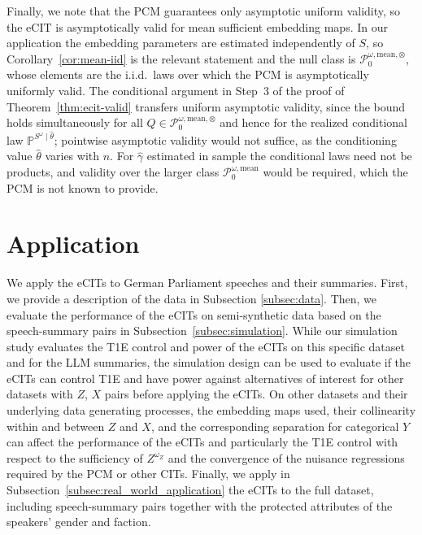 \documentclass[twoside,11pt]{article}
\begin{document}
Finally, we note that the PCM guarantees only asymptotic uniform validity, so the eCIT is asymptotically valid for mean sufficient embedding maps. 
In our application the embedding parameters are estimated independently of $S$, so Corollary~\ref{cor:mean-iid} is the relevant statement and the null class is $\mathcal P_0^{\omega,\mathrm{mean},\otimes}$, whose elements are the i.i.d.\ laws over which the PCM is asymptotically uniformly valid. 
The conditional argument in Step~3 of the proof of Theorem~\ref{thm:ecit-valid} transfers uniform asymptotic validity, since the bound holds simultaneously for all $Q\in\mathcal P_0^{\omega,\mathrm{mean},\otimes}$ and hence for the realized conditional law $\mathbb P^{S^\omega\mid\hat\theta}$; pointwise asymptotic validity would not suffice, as the conditioning value $\hat\theta$ varies with $n$. For $\hat\gamma$ estimated in sample the conditional laws need not be products, and validity over the larger class $\mathcal P_0^{\omega,\mathrm{mean}}$ would be required, which the PCM is not known to provide.


\section{Application}\label{sec:application}

We apply the eCITs to German Parliament speeches and their summaries. 
First, we provide a description of the data in Subsection \ref{subsec:data}. 
Then, we evaluate the performance of the eCITs on semi-synthetic data based on the speech-summary pairs in Subsection~\ref{subsec:simulation}. 
While our simulation study evaluates the T1E control and power of the eCITs on this specific dataset and for the LLM summaries, the simulation design can be used to evaluate if the eCITs can control T1E and have power against alternatives of interest for other datasets with $Z$, $X$ pairs before applying the eCITs. 
On other datasets and their underlying data generating processes, the embedding maps used, their collinearity within and between $Z$ and $X$, and the corresponding separation for categorical $Y$ can affect the performance of the eCITs and particularly the T1E control with respect to the sufficiency of $Z^{\omega_Z}$ and the convergence of the nuisance regressions required by the PCM or other CITs. 
Finally, we apply in Subsection~\ref{subsec:real_world_application} the eCITs to the full dataset, including speech-summary pairs together with the protected attributes of the speakers' gender and faction. 
\end{document}
